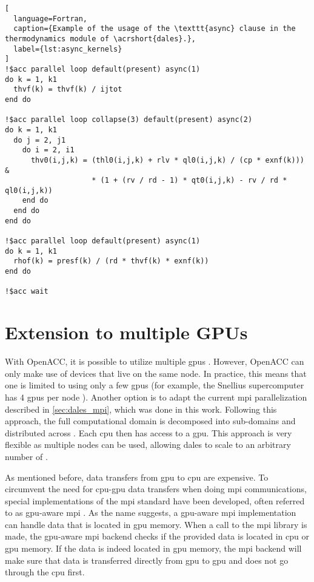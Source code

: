 \vfill \pagebreak

\begin{lstlisting}[
  language=Fortran,
  caption={Example of the usage of the \texttt{async} clause in the thermodynamics module of \acrshort{dales}.},
  label={lst:async_kernels}
]
!$acc parallel loop default(present) async(1)
do k = 1, k1
  thvf(k) = thvf(k) / ijtot
end do

!$acc parallel loop collapse(3) default(present) async(2)
do k = 1, k1
  do j = 2, j1
    do i = 2, i1 
      thv0(i,j,k) = (thl0(i,j,k) + rlv * ql0(i,j,k) / (cp * exnf(k))) &
                    * (1 + (rv / rd - 1) * qt0(i,j,k) - rv / rd * ql0(i,j,k))
    end do
  end do
end do

!$acc parallel loop default(present) async(1)
do k = 1, k1
  rhof(k) = presf(k) / (rd * thvf(k) * exnf(k))
end do

!$acc wait
\end{lstlisting}
\section{Extension to multiple GPUs}
With OpenACC, it is possible to utilize multiple \acrshort{gpu}s \citep{farberParallelProgrammingOpenACC2017}. However, OpenACC can only make use of devices that live on the same node. In practice, this means that one is limited to using only a few \acrshort{gpu}s (for example, the Snellius supercomputer has 4 \acrshort{gpu}s per node \citep{surfSnelliusHardwareFile}). Another option is to adapt the current \acrshort{mpi} parallelization described in \autoref{sec:dales_mpi}, which was done in this work. Following this approach, the full computational domain is decomposed into sub-domains and distributed across . Each \acrshort{cpu} then has access to a \acrshort{gpu}. This approach is very flexible as multiple nodes can be used, allowing \acrshort{dales} to scale to an arbitrary number of .

As mentioned before, data transfers from \acrshort{gpu} to \acrshort{cpu} are expensive. To circumvent the need for \acrshort{cpu}-\acrshort{gpu} data transfers when doing \acrshort{mpi} communications, special implementations of the \acrshort{mpi} standard have been developed, often referred to as \acrshort{gpu}-aware \acrshort{mpi} \citep{potluriEfficientInternodeMPI2013}. As the name suggests, a \acrshort{gpu}-aware \acrshort{mpi} implementation can handle data that is located in \acrshort{gpu} memory. When a call to the \acrshort{mpi} library is made, the \acrshort{gpu}-aware \acrshort{mpi} backend checks if the provided data is located in \acrshort{cpu} or \acrshort{gpu} memory. If the data is indeed located in \acrshort{gpu} memory, the \acrshort{mpi} backend will make sure that data is transferred directly from \acrshort{gpu} to \acrshort{gpu} and does not go through the \acrshort{cpu} first.

